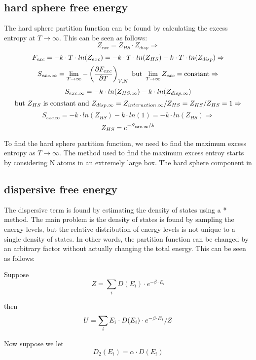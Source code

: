 \subsection{hard sphere free energy}
The hard sphere partition function can be found by calculating the excess entropy at $T\to\infty$. This can be seen as follows:
$$Z_{exc}=Z_{HS}\cdot Z_{disp}\Rightarrow$$
$$\newline F_{exc}=-k\cdot T\cdot ln(Z_{exc})=-k\cdot T\cdot ln(Z_{HS})-k\cdot T\cdot ln(Z_{disp})\Rightarrow $$
$$\newline S_{exc.\infty}=\lim_{T\to\infty}-\left ( \frac{\partial F_{exc}}{\partial T} \right ) _{V,N} \text{ but }\lim_{T\to\infty}Z_{exc}=\text{constant}\Rightarrow$$
$$\newline S_{exc.\infty}=-k\cdot ln(Z_{HS.\infty})-k\cdot ln(Z_{disp.\infty})$$
$$\newline \text{but }Z_{HS}\text{ is constant and }Z_{disp.\infty}=Z_{interaction.\infty}/Z_{HS}=Z_{HS}/Z_{HS}=1 \Rightarrow$$
$$S_{exc.\infty}=-k\cdot ln(Z_{HS})-k\cdot ln(1)=-k\cdot ln(Z_{HS}) \Rightarrow$$
$$\newline Z_{HS}=e^{-S_{exc.\infty}/k}$$

To find the hard sphere partition function, we need to find the maximum excess entropy as $T\to\infty$. The method used to find the maximum excess entroy starts by considering N atoms in an extremely large box. The hard sphere component in 
\subsection{dispersive free energy}
The dispersive term is found by estimating the density of states using a * method. The main problem is the density of states is found by sampling the energy levels, but the relative distribution of energy levels is not unique to a single density of states. In other words, the partition function can be changed by an arbitrary factor without actually changing the total energy. This can be seen as follows:

Suppose $$Z=\sum_i D(E_i)\cdot e^{-\beta\cdot E_i}$$

then $$U=\sum_i E_i\cdot D(E_i)\cdot e^{-\beta\cdot E_i}/Z\newline$$

Now suppose we let $$D_2(E_i)=\alpha\cdot D(E_i)$$

